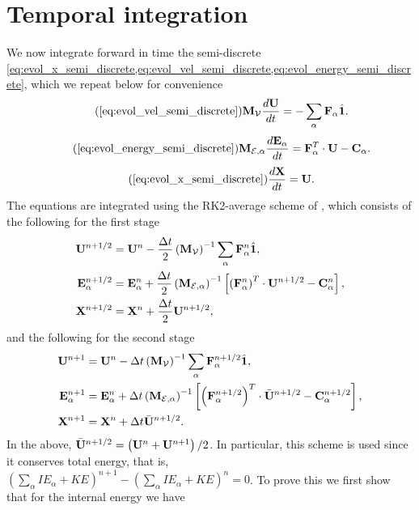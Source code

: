 \documentclass[11pt]{report}
\begin{document}
\section{Temporal integration}
We now integrate forward in time the semi-discrete \cref{eq:evol_x_semi_discrete,eq:evol_vel_semi_discrete,eq:evol_energy_semi_discrete}, which we repeat below for convenience
\begin{equation}
    \tag{\ref{eq:evol_vel_semi_discrete}}
    \Mvec_\mathcal{V} \frac{d\Uvec}{dt} = -\sum_\alpha \Fvec_\alpha \hat{\mathbf{1}}.
\end{equation}
\begin{equation}
    \tag{\ref{eq:evol_energy_semi_discrete}}
    \Mvec_{\mathcal{E},\alpha} \frac{d\Evec_\alpha}{dt} = \Fvec^T_\alpha \cdot \Uvec - \Cvec_\alpha.
\end{equation}
\begin{equation}
    \tag{\ref{eq:evol_x_semi_discrete}}
    \frac{d\Xvec}{dt} = \Uvec.
\end{equation}
The equations are integrated using the RK2-average scheme of \cite{dobrev2012}, which consists of the following for the first stage
\begin{align}
    \mathbf{U}^{n+1/2} &= \mathbf{U}^n - \frac{\Delta t}{2} \left( \mathbf{M}_\mathcal{V} \right)^{-1} \sum_\alpha \mathbf{F}^n_\alpha \hat{\mathbf{1}}, \nonumber \\
    \mathbf{E}^{n+1/2}_\alpha &= \mathbf{E}^n_\alpha + \frac{\Delta t}{2} \left( \mathbf{M}_{\mathcal{E},\alpha} \right)^{-1} \left[ \left( \mathbf{F}^n_\alpha \right)^T \cdot \mathbf{U}^{n+1/2} -\mathbf{C}^n_\alpha \right], \nonumber \\
    \mathbf{X}^{n+1/2} &= \mathbf{X}^n + \frac{\Delta t}{2} \mathbf{U}^{n+1/2},
\end{align}
and the following for the second stage
\begin{align}
    \mathbf{U}^{n+1} &= \mathbf{U}^n - \Delta t \left( \mathbf{M}_\mathcal{V} \right)^{-1} \sum_\alpha \mathbf{F}^{n+1/2}_\alpha \hat{\mathbf{1}}, \nonumber \\
    \mathbf{E}^{n+1}_\alpha &= \mathbf{E}^n_\alpha + \Delta t \left( \mathbf{M}_{\mathcal{E},\alpha} \right)^{-1} \left[ \left( \mathbf{F}^{n+1/2}_\alpha \right)^T \cdot \bar{\mathbf{U}}^{n+1/2} - \mathbf{C}^{n+1/2}_\alpha \right], \nonumber \\
    \mathbf{X}^{n+1} &= \mathbf{X}^n + \Delta t \bar{\mathbf{U}}^{n+1/2}.
\end{align}
In the above, $\bar{\mathbf{U}}^{n+1/2} = \left( \mathbf{U}^n + \mathbf{U}^{n+1} \right)/2$. In particular, this scheme is used since it conserves total energy, that is, $(\sum_\alpha IE_\alpha + KE)^{n+1} - (\sum_\alpha IE_\alpha + KE)^n = 0$. To prove this we first show that for the internal energy we have
\end{document}
